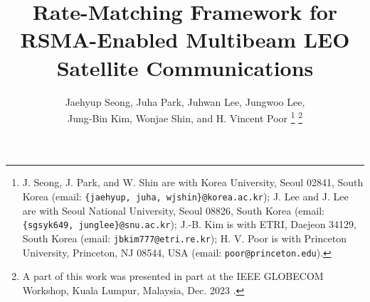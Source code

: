 \documentclass[draftclsnofoot, onecolumn, comsoc, 12pt]{IEEEtran}
\begin{document}
\title{{Rate-Matching Framework for RSMA-Enabled Multibeam LEO Satellite Communications}}

\author{Jaehyup Seong, Juha Park, Juhwan Lee, Jungwoo Lee,\\ Jung-Bin Kim,  Wonjae Shin, and H. Vincent Poor %
    \thanks{J. Seong, J. Park, and W. Shin are with %
    Korea University, Seoul 02841, South Korea 
    (email: {\texttt{\{jaehyup, juha, wjshin\}@korea.ac.kr}});
    J. Lee and J. Lee are with %
    Seoul National University, Seoul 08826, South Korea (email: {\texttt{\{sgsyk649, junglee\}@snu.ac.kr}});
    J.-B. Kim is with %
    ETRI, Daejeon 34129, South Korea (email: {\texttt{jbkim777@etri.re.kr}});
    H. V. Poor is with %
    Princeton University, Princeton, NJ 08544, USA (email: {\texttt{poor@princeton.edu}}).
    }    \thanks{A part of this work was presented in
part at the IEEE GLOBECOM Workshop, Kuala Lumpur, Malaysia, Dec. 2023 \cite{seong2023robust}.}}
\end{document}
